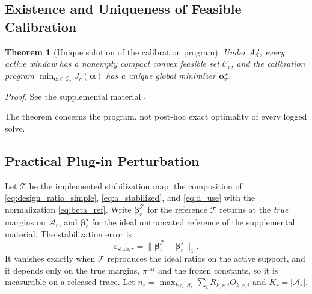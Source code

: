 \documentclass[letterpaper,journal]{IEEEtran}
\newtheorem{theorem}{Theorem}
\begin{document}
\subsection{Existence and Uniqueness of Feasible Calibration}
\label{subsec:theorem_calibration}

\begin{theorem}[Unique solution of the calibration program]
\label{thm:calibration}
Under A4, every active window has a nonempty compact convex feasible set
$\mathcal{C}_r$, and the calibration program
$\min_{\boldsymbol\alpha\in\mathcal{C}_r}J_r(\boldsymbol\alpha)$
has a unique global minimizer $\boldsymbol\alpha_r^\star$.
\end{theorem}

\noindent\emph{Proof.}
See the supplemental material.\hfill$\square$

The theorem concerns the program, not post-hoc exact optimality of every
logged solve.

\subsection{Practical Plug-in Perturbation}
\label{subsec:prop_plugin}

Let $\mathcal{T}$ be the implemented stabilization map: the composition of
\eqref{eq:design_ratio_simple}, \eqref{eq:a_stabilized}, and \eqref{eq:d_use}
with the normalization \eqref{eq:beta_ref}.  Write
$\boldsymbol\beta_r^{\mathcal T}$ for the reference $\mathcal{T}$ returns at
the \emph{true} margins on $\mathcal{A}_r$, and $\boldsymbol\beta_r^\star$
for the ideal untruncated reference of the supplemental material.  The
stabilization error is
\begin{equation}
\varepsilon_{\mathrm{stab},r}
=
\bigl\|\boldsymbol\beta_r^{\mathcal T}-\boldsymbol\beta_r^\star\bigr\|_1 .
\label{eq:eps_stab}
\end{equation}
It vanishes exactly when $\mathcal{T}$ reproduces the ideal ratios on the
active support, and it depends only on the true margins, $\pi^{\mathrm{tar}}$
and the frozen constants, so it is measurable on a released trace.  Let
$n_r=\max_{k\in\mathcal{A}_r}\sum_i R_{k,r,i}O_{k,r,i}$ and
$K_r=|\mathcal{A}_r|$.
\end{document}
